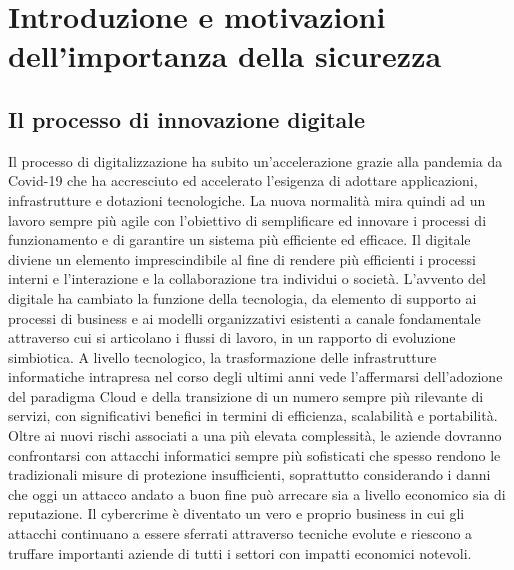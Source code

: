 \listoffigures
\chapter{Introduzione e motivazioni dell'importanza della sicurezza}
\section{Il processo di innovazione digitale}
Il processo di digitalizzazione ha subito un’accelerazione grazie alla pandemia da Covid-19 che ha accresciuto ed accelerato l’esigenza di adottare applicazioni, infrastrutture e dotazioni tecnologiche. La nuova normalità mira quindi ad un lavoro sempre più agile con  l’obiettivo di semplificare ed innovare i processi di funzionamento e di garantire un sistema più efficiente ed efficace. Il digitale diviene un elemento imprescindibile al fine di rendere più efficienti i processi interni e l’interazione e la collaborazione tra individui o società. 
L’avvento del digitale ha cambiato la funzione della tecnologia, da elemento di supporto ai processi di business e ai modelli organizzativi esistenti a canale fondamentale attraverso cui si articolano i flussi di lavoro, in un rapporto di evoluzione simbiotica. A livello tecnologico, la trasformazione delle infrastrutture informatiche intrapresa nel corso degli ultimi anni vede l’affermarsi dell’adozione del paradigma Cloud e della transizione di un numero sempre più rilevante di servizi, con significativi benefici in termini di efficienza, scalabilità e portabilità.
Oltre ai nuovi rischi associati a una più elevata complessità, le aziende dovranno confrontarsi con attacchi informatici sempre più sofisticati che spesso rendono le tradizionali misure di protezione insufficienti, soprattutto considerando i danni che oggi un attacco andato a buon fine può arrecare sia a livello economico sia di reputazione. Il cybercrime è diventato un vero e proprio business in cui gli attacchi continuano a essere sferrati attraverso tecniche evolute e riescono a truffare importanti aziende di tutti i settori con impatti economici notevoli.
\cite{art1}

